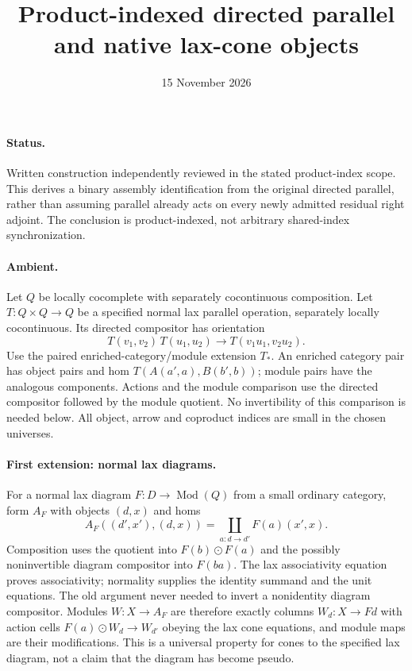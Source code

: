 \documentclass{article}
\title{Product-indexed directed parallel and native lax-cone objects}
\date{15 November 2026}
\begin{document}
\maketitle
\paragraph{Status.} Written construction independently reviewed in the stated product-index scope. This derives a binary assembly identification from the original directed parallel, rather than assuming parallel already acts on every newly admitted residual right adjoint. The conclusion is product-indexed, not arbitrary shared-index synchronization.

\paragraph{Ambient.} Let $Q$ be locally cocomplete with separately cocontinuous composition. Let $T:Q\times Q\to Q$ be a specified normal lax parallel operation, separately locally cocontinuous. Its directed compositor has orientation
\[
 T(v_1,v_2)\,T(u_1,u_2)\longrightarrow T(v_1u_1,v_2u_2).
\]
Use the paired enriched-category/module extension $T_*$. An enriched category pair has object pairs and hom $T(A(a',a),B(b',b))$; module pairs have the analogous components. Actions and the module comparison use the directed compositor followed by the module quotient. No invertibility of this comparison is needed below. All object, arrow and coproduct indices are small in the chosen universes.

\paragraph{First extension: normal lax diagrams.} For a normal lax diagram $F:D\to\operatorname{Mod}(Q)$ from a small ordinary category, form $A_F$ with objects $(d,x)$ and homs
\[
 A_F((d',x'),(d,x))=\coprod_{a:d\to d'}F(a)(x',x).
\]
Composition uses the quotient into $F(b)\odot F(a)$ and the possibly noninvertible diagram compositor into $F(ba)$. The lax associativity equation proves associativity; normality supplies the identity summand and the unit equations. The old argument never needed to invert a nonidentity diagram compositor. Modules $W:X\to A_F$ are therefore exactly columns $W_d:X\to Fd$ with action cells $F(a)\odot W_d\to W_{d'}$ obeying the lax cone equations, and module maps are their modifications. This is a universal property for cones to the specified lax diagram, not a claim that the diagram has become pseudo.
\end{document}

